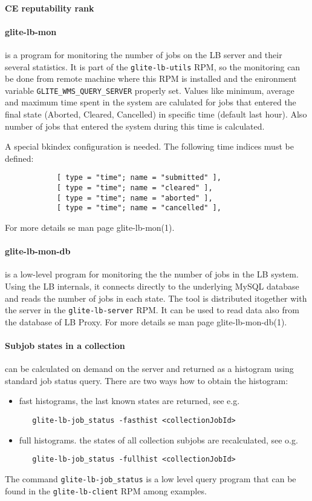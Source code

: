 \paragraph{CE reputability rank}


\paragraph{glite-lb-mon} is a program for monitoring the number of jobs on the
LB server and their several statistics. It is part of the
\verb'glite-lb-utils' RPM, so the monitoring can be done from remote machine
where this RPM is installed and the enironment variable
\verb'GLITE_WMS_QUERY_SERVER' properly set. Values like minimum, average and
maximum time spent in the system are calulated for jobs that entered  the
final  state (Aborted,  Cleared,  Cancelled) in specific time (default last
hour). Also number of jobs that entered the system during this time is
calculated.

A special bkindex configuration is needed. 
The following time indices must be defined:
\begin{verbatim}
            [ type = "time"; name = "submitted" ],
            [ type = "time"; name = "cleared" ],
            [ type = "time"; name = "aborted" ],
            [ type = "time"; name = "cancelled" ],
\end{verbatim}
For more details se man page glite-lb-mon(1).


\paragraph{glite-lb-mon-db} is a low-level program for monitoring the the
number of jobs in the LB system. Using the LB internals, it connects directly
to the underlying MySQL database and reads the number of jobs in each state.
The tool is distributed itogether with the server in the \verb'glite-lb-server' RPM.
It can be used to read data also from the database of LB Proxy.
For more details se man page glite-lb-mon-db(1).


\paragraph{Subjob states in a collection} can be calculated on demand on the server and
returned as a histogram using standard job status query. There are two ways how to obtain the 
histogram:
\begin{itemize}
\item fast histograms, the last known states are returned, see e.g.
\begin{verbatim}
   glite-lb-job_status -fasthist <collectionJobId>
\end{verbatim}
\item full histograms. the states of all collection subjobs are recalculated, see o.g.
\begin{verbatim}
   glite-lb-job_status -fullhist <collectionJobId>
\end{verbatim}
\end{itemize}
The command \verb'glite-lb-job_status' is a low level query program that can be
found in the \verb'glite-lb-client' RPM among examples.


